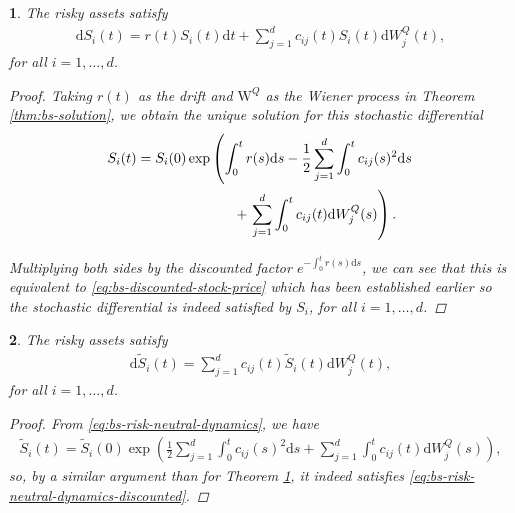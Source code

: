 \documentclass[english]{article}
\numberwithin{equation}{section}
\numberwithin{figure}{section}
\theoremstyle{bolddescit}
\newtheorem{theorem}{\protect\theoremname}[section]
\theoremstyle{definition}
\theoremstyle{definition}
\theoremstyle{plain}
\theoremstyle{plain}
\theoremstyle{bolddesc}
\theoremstyle{plain}
\theoremstyle{remark}
\providecommand{\theoremname}{Theorem}
\begin{document}
\begin{theorem}\label{thm:bs-risk-neutral-dynamics}
  The risky assets satisfy
  \begin{align*}
    \mathrm{d}S_i(t) = r(t) S_i(t) \mathrm{d}t + \sum_{j=1}^{d} c_{ij}(t) S_i(t) \mathrm{d}W^Q_j(t),
  \end{align*}
  for all $i=1,\ldots,d$.

  \begin{proof}
    Taking $r(t)$ as the drift and $\mathrm{W}^Q$ as the Wiener process in Theorem \ref{thm:bs-solution}, we obtain the unique solution for this stochastic differential
    \begin{align}\label{eq:bs-risk-neutral-dynamics}
      S_i(t)
      = S_i(0) \exp & \left( \int_0^t r(s) \mathrm{d}s - \frac{1}{2} \sum_{j=1}^{d} \int_0^t c_{ij}(s)^2 \mathrm{d}s \right. \notag\\
      &\ \ \ \ \ + \left.\sum_{j=1}^d \int_0^t c_{ij}(t) \mathrm{d}W^Q_j(s)\right).
    \end{align}

    Multiplying both sides by the discounted factor $e^{-\int_0^t r(s) \mathrm{d}s}$, we can see that this is equivalent to \eqref{eq:bs-discounted-stock-price} which has been established earlier so the stochastic differential is indeed satisfied by $S_i$, for all $i=1,\ldots,d$.
  \end{proof}
\end{theorem}

\begin{theorem}\label{thm:bs-risk-neutral-dynamics-discounted}
  The risky assets satisfy
  \begin{align}\label{eq:bs-risk-neutral-dynamics-discounted}
    \mathrm{d}\widetilde{S}_i(t) = \sum_{j=1}^{d} c_{ij}(t) \widetilde{S}_i(t) \mathrm{d}W^Q_j(t),
  \end{align}
  for all $i=1,\ldots,d$.

  \begin{proof}
    From \eqref{eq:bs-risk-neutral-dynamics}, we have
    \begin{align*}
      \widetilde{S}_i(t)
      = \widetilde{S}_i(0) \exp \left( \frac{1}{2} \sum_{j=1}^{d} \int_0^t c_{ij}(s)^2 \mathrm{d}s + \sum_{j=1}^d \int_0^t c_{ij}(t) \mathrm{d}W^Q_j(s)\right),
    \end{align*}
    so, by a similar argument than for Theorem \ref{thm:bs-risk-neutral-dynamics}, it indeed satisfies \eqref{eq:bs-risk-neutral-dynamics-discounted}.
  \end{proof}
\end{theorem}
\end{document}
